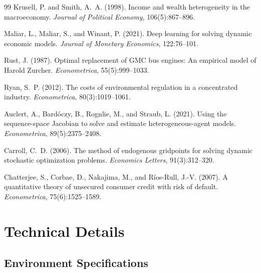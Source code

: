 \documentclass[12pt]{article}
\begin{document}
\begin{thebibliography}{99}
Krusell, P. and Smith, A.~A. (1998).
\newblock Income and wealth heterogeneity in the macroeconomy.
\newblock \textit{Journal of Political Economy}, 106(5):867--896.

Maliar, L., Maliar, S., and Winant, P. (2021).
\newblock Deep learning for solving dynamic economic models.
\newblock \textit{Journal of Monetary Economics}, 122:76--101.

Rust, J. (1987).
\newblock Optimal replacement of GMC bus engines: An empirical model of Harold Zurcher.
\newblock \textit{Econometrica}, 55(5):999--1033.

Ryan, S.~P. (2012).
\newblock The costs of environmental regulation in a concentrated industry.
\newblock \textit{Econometrica}, 80(3):1019--1061.

Auclert, A., Bard\'{o}czy, B., Rognlie, M., and Straub, L. (2021).
\newblock Using the sequence-space Jacobian to solve and estimate heterogeneous-agent models.
\newblock \textit{Econometrica}, 89(5):2375--2408.

Carroll, C.~D. (2006).
\newblock The method of endogenous gridpoints for solving dynamic stochastic optimization problems.
\newblock \textit{Economics Letters}, 91(3):312--320.

Chatterjee, S., Corbae, D., Nakajima, M., and R\'{i}os-Rull, J.-V. (2007).
\newblock A quantitative theory of unsecured consumer credit with risk of default.
\newblock \textit{Econometrica}, 75(6):1525--1589.

\end{thebibliography}


\newpage
\appendix

\section{Technical Details}

\subsection{Environment Specifications}
\end{document}
